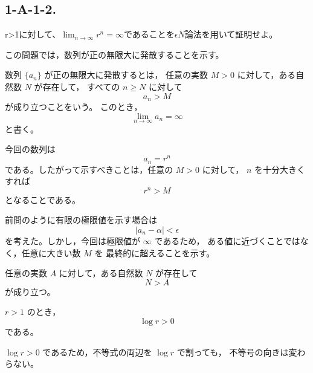 \subsection{1-A-1-2.}
\begin{exercise}
	r>1に対して、$\lim_{n\rightarrow\infty}r^n=\infty$であることを$\epsilon N$論法を用いて証明せよ。
\end{exercise}

\begin{background}
	この問題では，数列が正の無限大に発散することを示す。

	\begin{definition}[数列が正の無限大に発散すること]
		数列 $\{a_n\}$ が正の無限大に発散するとは，
		任意の実数 $M>0$ に対して，ある自然数 $N$ が存在して，
		すべての $n\geq N$ に対して
		\[
			a_n>M
		\]
		が成り立つことをいう。
		このとき，
		\[
			\lim_{n\to\infty}a_n=\infty
		\]
		と書く。
	\end{definition}

	\begin{remark}
		今回の数列は
		\[
			a_n=r^n
		\]
		である。したがって示すべきことは，任意の $M>0$ に対して，
		$n$ を十分大きくすれば
		\[
			r^n>M
		\]
		となることである。
	\end{remark}

	\begin{remark}
		前問のように有限の極限値を示す場合は
		\[
			|a_n-\alpha|<\epsilon
		\]
		を考えた。しかし，今回は極限値が $\infty$ であるため，
		ある値に近づくことではなく，任意に大きい数 $M$ を
		最終的に超えることを示す。
	\end{remark}

	\begin{theorem}[アルキメデスの性質]
		任意の実数 $A$ に対して，ある自然数 $N$ が存在して
		\[
			N>A
		\]
		が成り立つ。
	\end{theorem}

	\begin{lemma}
		$r>1$ のとき，
		\[
			\log r>0
		\]
		である。
	\end{lemma}

	\begin{remark}
		$\log r>0$ であるため，不等式の両辺を $\log r$ で割っても，
		不等号の向きは変わらない。
	\end{remark}
\end{background}

